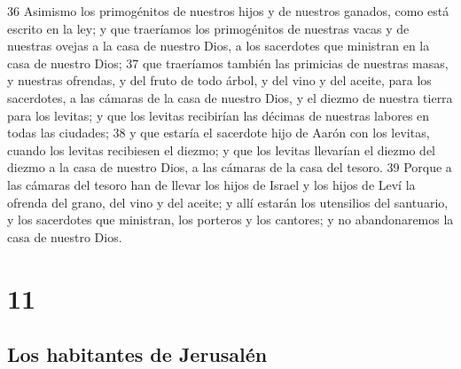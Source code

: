 36 Asimismo los primogénitos de nuestros hijos y de nuestros ganados, como está escrito en la ley; y que traeríamos los primogénitos de nuestras vacas y de nuestras ovejas a la casa de nuestro Dios, a los sacerdotes que ministran en la casa de nuestro Dios; 
37 que traeríamos también las primicias de nuestras masas, y nuestras ofrendas, y del fruto de todo árbol, y del vino y del aceite, para los sacerdotes, a las cámaras de la casa de nuestro Dios, y el diezmo de nuestra tierra para los levitas; y que los levitas recibirían las décimas de nuestras labores en todas las ciudades;
38 y que estaría el sacerdote hijo de Aarón con los levitas, cuando los levitas recibiesen el diezmo; y que los levitas llevarían el diezmo del diezmo a la casa de nuestro Dios, a las cámaras de la casa del tesoro.
39 Porque a las cámaras del tesoro han de llevar los hijos de Israel y los hijos de Leví la ofrenda del grano, del vino y del aceite; y allí estarán los utensilios del santuario, y los sacerdotes que ministran, los porteros y los cantores; y no abandonaremos la casa de nuestro Dios.

\chapter{11}

\section*{Los habitantes de Jerusalén}


